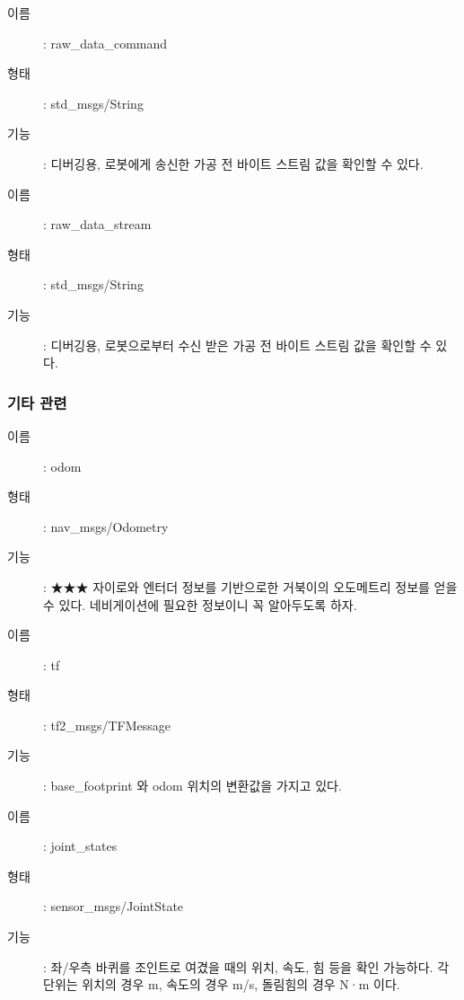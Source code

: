 \vspace{\baselineskip}
\begin{description}
\item[이름]: raw\_data\_command
\item[형태]: std\_msgs/String
\item[기능]: 디버깅용, 로봇에게 송신한 가공 전 바이트 스트림 값을 확인할 수 있다.
\end{description}

\vspace{\baselineskip}
\begin{description}
\item[이름]: raw\_data\_stream
\item[형태]: std\_msgs/String
\item[기능]: 디버깅용, 로봇으로부터 수신 받은 가공 전 바이트 스트림 값을 확인할 수 있다.
\end{description}

\subsubsection{기타 관련}

\vspace{\baselineskip}
\begin{description}
\item[이름]: odom
\item[형태]: nav\_msgs/Odometry
\item[기능]: ★★★ 자이로와 엔터더 정보를 기반으로한 거북이의 오도메트리 정보를 얻을 수 있다. 네비게이션에 필요한 정보이니 꼭 알아두도록 하자.
\end{description}

\vspace{\baselineskip}
\begin{description}
\item[이름]: tf
\item[형태]: tf2\_msgs/TFMessage
\item[기능]: base\_footprint 와 odom 위치의 변환값을 가지고 있다.
\end{description}

\vspace{\baselineskip}
\begin{description}
\item[이름]: joint\_states
\item[형태]: sensor\_msgs/JointState
\item[기능]: 좌/우측 바퀴를 조인트로 여겼을 때의 위치, 속도, 힘 등을 확인 가능하다. 각 단위는 위치의 경우 m, 속도의 경우 m/s, 돌림힘의 경우 N·m 이다.
\end{description}

